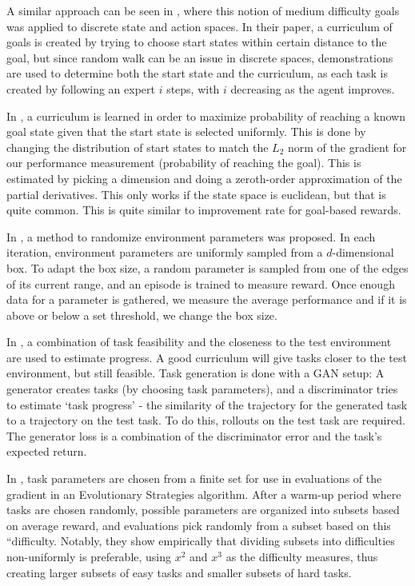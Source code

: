 \documentclass[letterpaper]{article}
\theoremstyle{definition}
\begin{document}
A similar approach can be seen in \cite{Srinivasan2019}, where this notion of medium difficulty goals was applied to discrete state and action spaces. In their paper, a curriculum of goals is created by trying to choose start states within certain distance to the goal, but since random walk can be an issue in discrete spaces, demonstrations are used to determine both the start state and the curriculum, as each task is created by following an expert $i$ steps, with $i$ decreasing as the agent improves.

In \cite{Wohlke2020}, a curriculum is learned in order to maximize probability of reaching a known goal state given that the start state is selected uniformly. This is done by changing the distribution of start states to match the $L_2$ norm of the gradient for our performance measurement (probability of reaching the goal). This is estimated by picking a dimension and doing a zeroth-order approximation of the partial derivatives. This only works if the state space is euclidean, but that is quite common. This is quite similar to improvement rate for goal-based rewards.

In \cite{Akkaya2019}, a method to randomize environment parameters was proposed. In each iteration, environment parameters are uniformly sampled from a $d$-dimensional box. To adapt the box size, a random parameter is sampled from one of the edges of its current range, and an episode is trained to measure reward. Once enough data for a parameter is gathered, we measure the average performance and if it is above or below a set threshold, we change the box size. 

In \cite{Fang2020}, a combination of task feasibility and the closeness to the test environment are used to estimate progress. A good curriculum will give tasks closer to the test environment, but still feasible. Task generation is done with a GAN setup: A generator creates tasks (by choosing task parameters), and a discriminator tries to estimate `task progress' - the similarity of the trajectory for the generated task to a trajectory on the test task. To do this, rollouts on the test task are required. The generator loss is a combination of the discriminator error and the task's expected return.

In \cite{Milano2021}, task parameters are chosen from a finite set for use in evaluations of the gradient in an Evolutionary Strategies algorithm. After a warm-up period where tasks are chosen randomly, possible parameters are organized into subsets based on average reward, and evaluations pick randomly from a subset based on this ``difficulty. Notably, they show empirically that dividing subsets into difficulties non-uniformly is preferable, using $x^2$ and $x^3$ as the difficulty measures, thus creating larger subsets of easy tasks and smaller subsets of hard tasks. 
\end{document}
